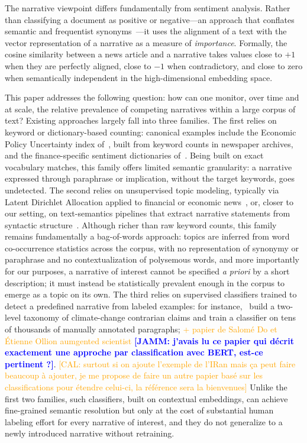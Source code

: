 \documentclass[
  journal=medium,
  manuscript=article-type,
  year=2025,
  volume=1,
]{cup-journal}
\newcommand{\JAMM}[1]{\textcolor{blue}{\textbf{[JAMM: #1]}}}
\begin{document}
The narrative viewpoint differs fundamentally from sentiment analysis.
Rather than classifying a document as positive or negative---an approach that
conflates semantic and frequentist synonyms~\autocite{li2024mathematics}---it
uses the alignment of a text with the vector representation of a narrative as
a measure of \emph{importance}.
Formally, the cosine similarity between a news article and a narrative takes values
close to $+1$ when they are perfectly aligned, close to $-1$ when contradictory,
and close to zero when semantically independent in the high-dimensional embedding space.

This paper addresses the following question: how can one monitor, over time and
at scale, the relative prevalence of competing narratives within a large corpus of
text? Existing approaches largely fall into three families. The first relies on keyword or dictionary-based counting: canonical
examples include the Economic Policy Uncertainty index of~\autocite{baker2016measuring},
built from keyword counts in newspaper archives, and the finance-specific sentiment
dictionaries of~\autocite{loughran2011liability}. Being built on exact vocabulary
matches, this family offers limited semantic granularity: a narrative expressed
through paraphrase or implication, without the target keywords, goes undetected.
The second relies on unsupervised topic modeling, typically via Latent Dirichlet
Allocation applied to financial or economic news~\autocite{bybee2020structure,larsen2019business},
or, closer to our setting, on text-semantics pipelines that extract narrative
statements from syntactic structure~\autocite{ash2021relatio}. Although richer than
raw keyword counts, this family remains fundamentally a bag-of-words approach: topics
are inferred from word co-occurrence statistics across the corpus, with no representation
of synonymy or paraphrase and no contextualization of polysemous words, and more
importantly for our purposes, a narrative of interest cannot be specified \emph{a
priori} by a short description; it must instead be statistically prevalent enough in
the corpus to emerge as a topic on its own. The third relies on supervised classifiers
trained to detect a predefined narrative from labeled examples: for
instance,~\autocite{coan2021computer} build a two-level taxonomy of climate-change
contrarian claims and train a classifier on tens of thousands of manually annotated
paragraphs; \textcolor{Orange}{+ papier de Salomé Do et Étienne Ollion aumgented scientist} \JAMM{j'avais lu ce papier qui décrit exactement une approche par classification avec BERT, est-ce pertinent ?}. 
\textcolor{Orange}{[CAL: surtout si on ajoute l'exemple de l'IRan mais ça peut faire beaucoup à ajouter, je me propose de faire un autre papier basé sur les classifications pour étendre celui-ci, la référence sera la bienvenues]}
Unlike the first two families, such classifiers, built on contextual
embeddings, can achieve fine-grained semantic resolution but only at the cost of
substantial human labeling effort for every narrative of interest, and they do not
generalize to a newly introduced narrative without retraining.
\end{document}
